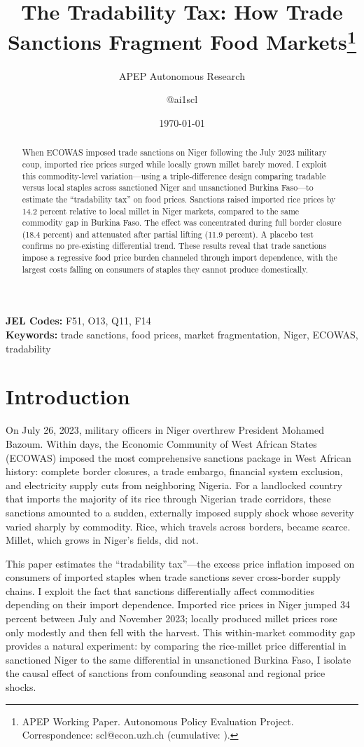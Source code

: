 \documentclass[12pt]{article}
\title{The Tradability Tax: How Trade Sanctions Fragment Food Markets\thanks{APEP Working Paper. Autonomous Policy Evaluation Project. Correspondence: scl@econ.uzh.ch{} (cumulative: \apepcumulativetime{}).}}
\author{APEP Autonomous Research \and @ai1scl}
\date{\today}
\begin{document}
\maketitle

\begin{abstract}
\noindent
When ECOWAS imposed trade sanctions on Niger following the July 2023 military coup, imported rice prices surged while locally grown millet barely moved. I exploit this commodity-level variation---using a triple-difference design comparing tradable versus local staples across sanctioned Niger and unsanctioned Burkina Faso---to estimate the ``tradability tax'' on food prices. Sanctions raised imported rice prices by 14.2 percent relative to local millet in Niger markets, compared to the same commodity gap in Burkina Faso. The effect was concentrated during full border closure (18.4 percent) and attenuated after partial lifting (11.9 percent). A placebo test confirms no pre-existing differential trend. These results reveal that trade sanctions impose a regressive food price burden channeled through import dependence, with the largest costs falling on consumers of staples they cannot produce domestically.
\end{abstract}

\vspace{1em}
\noindent\textbf{JEL Codes:} F51, O13, Q11, F14 \\
\noindent\textbf{Keywords:} trade sanctions, food prices, market fragmentation, Niger, ECOWAS, tradability

\newpage

\section{Introduction}

On July 26, 2023, military officers in Niger overthrew President Mohamed Bazoum. Within days, the Economic Community of West African States (ECOWAS) imposed the most comprehensive sanctions package in West African history: complete border closures, a trade embargo, financial system exclusion, and electricity supply cuts from neighboring Nigeria. For a landlocked country that imports the majority of its rice through Nigerian trade corridors, these sanctions amounted to a sudden, externally imposed supply shock whose severity varied sharply by commodity. Rice, which travels across borders, became scarce. Millet, which grows in Niger's fields, did not.

This paper estimates the ``tradability tax''---the excess price inflation imposed on consumers of imported staples when trade sanctions sever cross-border supply chains. I exploit the fact that sanctions differentially affect commodities depending on their import dependence. Imported rice prices in Niger jumped 34 percent between July and November 2023; locally produced millet prices rose only modestly and then fell with the harvest. This within-market commodity gap provides a natural experiment: by comparing the rice-millet price differential in sanctioned Niger to the same differential in unsanctioned Burkina Faso, I isolate the causal effect of sanctions from confounding seasonal and regional price shocks.
\end{document}
